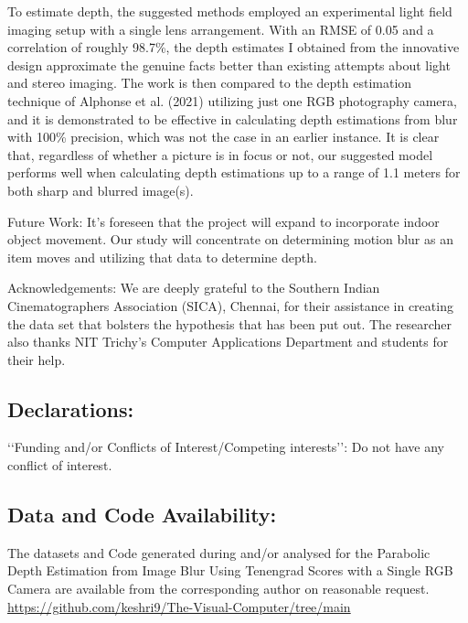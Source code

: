 \documentclass[sn-mathphys]{sn-jnl}%
\theoremstyle{thmstyleone}%
\theoremstyle{thmstyletwo}%
\theoremstyle{thmstylethree}%
\begin{document}
To estimate depth, the suggested methods employed an experimental light field imaging setup with a single lens arrangement. With an RMSE of 0.05 and a correlation of roughly 98.7\%, the depth estimates I obtained from the innovative design approximate the genuine facts better than existing attempts about light and stereo imaging. The work is then compared to the depth estimation technique of Alphonse et al. (2021) \cite{bib10} utilizing just one RGB  photography camera, and it is demonstrated to be effective in calculating depth estimations from blur with 100\% precision, which was not the case in an earlier instance. It is clear that, regardless of whether a picture is in focus or not, our suggested model performs well when calculating depth estimations up to a range of 1.1 meters for both sharp and blurred image(s).

Future Work: It's foreseen that the project will expand to incorporate indoor object movement. Our study will concentrate on determining motion blur as an item moves and utilizing that data to determine depth.

Acknowledgements:
We are deeply grateful to the Southern Indian Cinematographers Association (SICA), Chennai, for their assistance in creating the data set that bolsters the hypothesis that has been put out. The researcher also thanks NIT Trichy's Computer Applications Department and students for their help.\pagebreak

\subsection{Declarations:}

 \lq\lq Funding and/or Conflicts of Interest/Competing interests\rq\rq: Do not have any conflict of interest.
\subsection{Data and Code Availability:}The datasets and Code generated during and/or analysed for the Parabolic Depth Estimation from Image Blur Using Tenengrad Scores with a Single RGB Camera are available from the corresponding author on reasonable request. {\url{https://github.com/keshri9/The-Visual-Computer/tree/main}}


\end{document}
